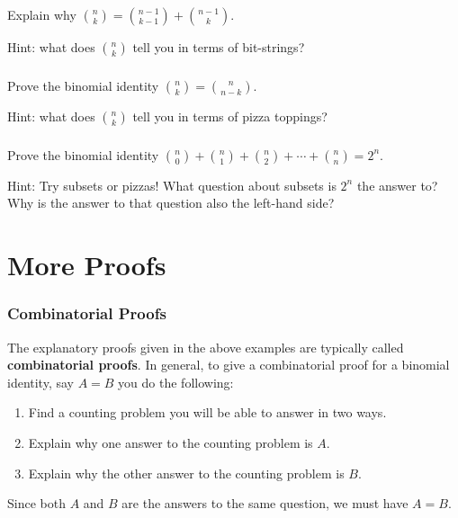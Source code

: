 \documentclass[11pt, compress]{beamer}
\newcommand{\terminology}[1]{\textbf{#1}}
\begin{document}
\begin{frame}
\frametitle{}
\begin{example}[1.4.3]Explain why \({n \choose k} = {n-1 \choose k-1} + {n-1 \choose k}\).

\pause \vfill 

Hint: what does \(\binom{n}{k}\) tell you in terms of bit-strings?
\end{example}
\end{frame}
 
\begin{frame}
\frametitle{}
\begin{example}[1.4.4]Prove the binomial identity \({n \choose k} = {n \choose n-k}\).

\pause \vfill 

Hint: what does \(\binom{n}{k}\) tell you in terms of pizza toppings?
\end{example}
\end{frame}
 
\begin{frame}
\frametitle{}
\begin{example}[1.4.5]Prove the binomial identity \({n\choose 0} + {n \choose 1} + {n\choose 2} + \cdots + {n \choose n} = 2^n\).

\pause \vfill 

Hint: Try subsets or pizzas!  What question about subsets is \(2^n\) the answer to?  Why is the answer to that question also the left-hand side?
\end{example}
\end{frame}
 


\section{More Proofs}
\begin{frame}
\frametitle{Combinatorial Proofs}
 The explanatory proofs given in the above examples are typically called \terminology{combinatorial proofs}. In general, to give a combinatorial proof for a binomial identity, say \(A = B\) you do the following:
 
\pause \vfill 

\begin{enumerate}
\item{} Find a counting problem you will be able to answer in two ways.


\item{} Explain why one answer to the counting problem is \(A\).


\item{} Explain why the other answer to the counting problem is \(B\).

\end{enumerate}

 
\pause \vfill 

Since both \(A\) and \(B\) are the answers to the same question, we must have \(A = B\).
\end{frame}
 
\end{document}
